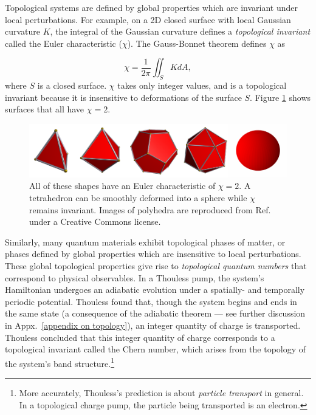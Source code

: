 \documentclass{beavtex_dub_edit}
\begin{document}
Topological systems are defined by global properties which are invariant under local perturbations. For example, on a 2D closed surface with local Gaussian curvature $K$, the integral of the Gaussian curvature defines a \textit{topological invariant} called the Euler characteristic ($\chi$). The Gauss-Bonnet theorem defines $\chi$ as

\begin{equation}
    \chi = \frac{1}{2\pi}\iint_S K dA,
\end{equation}
where $S$ is a closed surface. $\chi$ takes only integer values, and is a topological invariant because it is insensitive to deformations of the surface $S$. Figure \ref{surfaces} shows surfaces that all have $\chi = 2$.

\begin{figure}
    \includegraphics[width = 1\textwidth]{shapes intro fig.pdf}
    \caption{All of these shapes have an Euler characteristic of $\chi = 2$. A tetrahedron can be smoothly deformed into a sphere while $\chi$ remains invariant. Images of polyhedra are reproduced from Ref.\ \cite{webb_stella_nodate} under a Creative Commons license.}
    \label{surfaces}
\end{figure}

Similarly, many quantum materials exhibit topological phases of matter, or phases defined by global properties which are insensitive to local perturbations. These global topological properties give rise to \textit{topological quantum numbers} that correspond to physical observables. In a Thouless pump, the system's Hamiltonian undergoes an adiabatic evolution under a spatially- and temporally periodic potential. Thouless found that, though the system begins and ends in the same state (a consequence of the adiabatic theorem — see further discussion in Appx.\ \ref{appendix on topology}), an integer quantity of charge is transported. Thouless concluded that this integer quantity of charge corresponds to a topological invariant called the Chern number, which arises from the topology of the system's band structure.\footnote{More accurately, Thouless's prediction is about \textit{particle transport} in general. In a topological charge pump, the particle being transported is an electron.}
\end{document}
